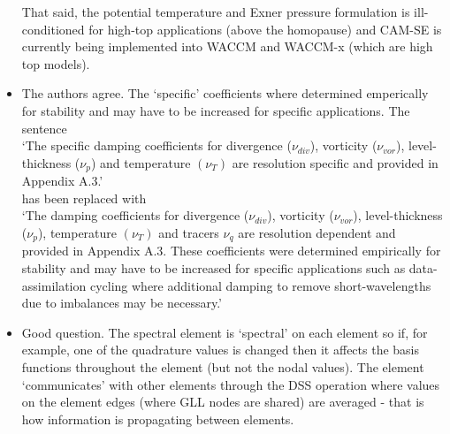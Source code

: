 \documentclass[11pt]{article}
\begin{document}
\begin{itemize}
That said, the potential temperature and Exner pressure formulation is ill-conditioned for high-top applications (above the homopause) and CAM-SE is currently being implemented into WACCM and WACCM-x (which are high top models).



\item {\color{blue}{Also in section 2.6: You make reference to the ``specific damping coefficients''. Shouldn't these be runtime-parameters? I presume that the best value of the damping will depend on the application (for example, data assimilation cycling may benefit from additional damping to remove short-wavelength waves due to imbalances) and may not be a simple function of resolution.}}

The authors agree. The `specific' coefficients where determined emperically for stability and may have to be increased for specific applications. The sentence\\

`The specific damping coefficients for divergence ($\nu_{div}$), vorticity ($\nu_{vor}$), level-thickness ($\nu_p$) and temperature $(\nu_T)$ are resolution specific and provided in Appendix A.3.'\\

has been replaced with \\

`The damping coefficients for divergence ($\nu_{div}$), vorticity ($\nu_{vor}$), level-thickness ($\nu_p$), temperature $(\nu_T)$ and tracers $\nu_q$ are resolution dependent and provided in Appendix A.3. These coefficients were determined empirically for stability and may have to be increased for specific applications such as data-assimilation cycling where additional damping to remove short-wavelengths due to imbalances may be necessary.'

\item {\color{blue}{ Section 3.3: I am unfamiliar with the spectral element method. In traditional finite-differencing schemes there is a well defined way for each grid point to be influenced by its neighbors. How does each element communicate with one another? Is it by the shared points on the edges of each element? Also, if indeed it is only by the edge points, then wouldn't a broader domain of dependence (with more points) be needed for a higher-order method?}}

Good question. The spectral element is `spectral' on each element so if, for example, one of the quadrature values is changed then it affects the basis functions throughout the element (but not the nodal values). The element `communicates' with other elements through the DSS operation where values on the element edges (where GLL nodes are shared) are averaged - that is how information is propagating between elements.\\


\end{itemize}
\end{document}
